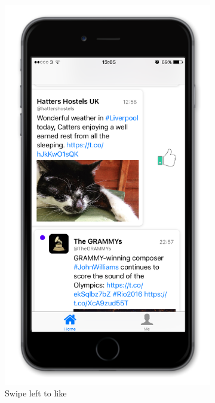 \documentclass{article}
\begin{document}
\begin{figure}[H]
    \begin{subfigure}[b]{0.48\textwidth}
        \includegraphics[width=\textwidth]{iphone_7_like1}
        \caption{Swipe left to like}
    \end{subfigure}
    ~ 
    \begin{subfigure}[b]{0.48\textwidth}

\end{subfigure}
\end{figure}
\end{document}
